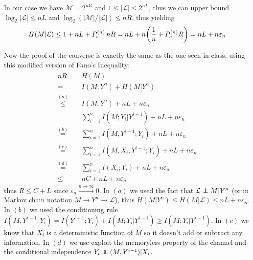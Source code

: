 In our case we have $\mathcal{M}=2^{nR}$ and $1\leq |\mathcal{L}| \leq 2^{nL}$, thus we can upper bound $\log_2|\mathcal{L}| \leq nL$ and $\log_2(|\mathcal{M}|/|\mathcal{L}|) \leq nR$, thus yielding
%
\begin{equation}
H(M|\mathcal{L}) \leq 1+nL+P_e^{(n)} \, nR = nL + n\qty(\frac{1}{n} + P_e^{(n)} R) = nL + n\varepsilon_n
\end{equation}

Now the proof of the converse is exactly the same as the one seen in class, using this modified version of Fano's Inequality:
%
\begin{align}
\begin{split}
nR =& H(M)\\
=&  I(M;Y^n) + H(M|Y^n)\\
\stackrel{(a)}{\leq}& I(M;Y^n) + nL + n\varepsilon_n\\
=& \sum_{i=1}^n I(M;Y_i|Y^{i-1}) + nL+n\varepsilon_n\\
\stackrel{(b)}{=}& \sum_{i=1}^n I(M,Y^{i-1};Y_i) + nL+n\varepsilon_n\\
\stackrel{(c)}{=}& \sum_{i=1}^n I(M,X_i,Y^{i-1};Y_i) + nL+n\varepsilon_n\\
\stackrel{(d)}{=}& \sum_{i=1}^n I(X_i;Y_i) + nL+n\varepsilon_n\\
\leq& nC + nL+n\varepsilon_n
\end{split}
\end{align}
%
thus $R\leq C+L$ since $\varepsilon_n \xrightarrow{n\rightarrow\infty} 0$. In $(a)$ we used the fact that $\mathcal{L} \independent M |Y^n$ (or in Markov chain notation $M\rightarrow Y^n\rightarrow \mathcal{L}$), thus $H(M|Y^n)\leq H(M|\mathcal{L}) \leq nL + n\varepsilon_n$. In $(b)$ we used the conditioning rule $I(M,Y^{i-1};Y_i) = I(Y^{i-1};Y_i) + I(M;Y_i|Y^{i-1}) \geq I(M;Y_i|Y^{i-1})$. In $(c)$ we know that $X_i$ is a deterministic function of $M$ so it doesn't add or subtract any information. In $(d)$ we use exploit the memoryless property of the channel and the conditional independence $Y_i \independent (M,Y^{i-1})|X_i$.


